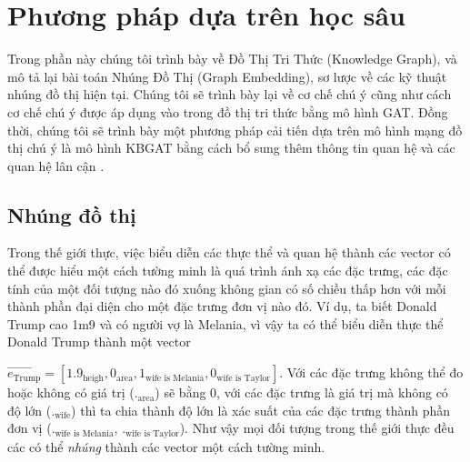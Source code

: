 
\chapter{Phương pháp dựa trên học sâu}
\label{chap:DeeLearning}

Trong phần này chúng tôi trình bày về Đồ Thị Tri Thức (Knowledge Graph), và mô tả lại bài toán Nhúng Đồ Thị (Graph Embedding), sơ lược về các kỹ thuật nhúng đồ thị hiện tại. Chúng tôi sẽ trình bày lại về cơ chế chú ý cũng như cách cơ chế chú ý được áp dụng vào trong đồ thị tri thức bằng mô hình GAT\cite{velivckovic2017graph}. Đồng thời, chúng tôi sẽ trình bày một phương pháp cải tiến dựa trên mô hình mạng đồ thị chú ý là mô hình KBGAT\cite{nathani2019learning} bằng cách bổ sung thêm thông tin quan hệ và các quan hệ lân cận .

\section{Nhúng đồ thị}
\label{sec:graphEmbedding}

Trong thế giới thực, việc biểu diễn các thực thể và quan hệ thành các vector có thể được hiểu một cách tường minh là quá trình ánh xạ các đặc trưng, các đặc tính của một đối tượng nào đó xuống không gian có số chiều thấp hơn với mỗi thành phần đại diện cho một đặc trưng đơn vị nào đó.
Ví dụ, ta biết Donald Trump cao 1m9 và có người vợ là Melania, vì vậy ta có thể biểu diễn thực thể Donald Trump thành một vector

$\overrightarrow{e_\text{Trump}} = [1.9_{\text{heigh}}, 0_{\text{area}}, 1_\text{wife is Melania}, 0_\text{wife is Taylor}]$. Với các đặc trưng không thể đo hoặc không có giá trị ($._{\text{area}}$) sẽ bằng 0, với các đặc trưng là giá trị mà không có độ lớn ($._{\text{wife}}$) thì ta chia thành độ lớn là xác suất của các đặc trưng thành phần đơn vị ($._{\text{wife is Melania}}$, $._{\text{wife is Taylor}}$). Như vậy mọi đối tượng trong thế giới thực đều các có thể \textit{nhúng} thành các vector một cách tường minh.

